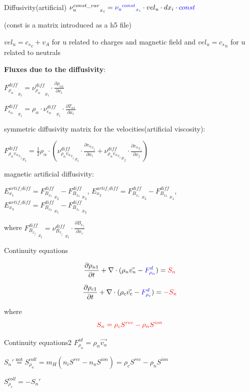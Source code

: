 \documentclass{beamer}
\begin{document}
\begin{frame}{Diffusivity(artificial)}
${\nu_u^{const\_var}}_{x_i}  = \textcolor{blue}{{{\nu_u}^{const}}_{x_i}} \cdot  vel_u \cdot  dx_i \cdot  \textcolor{blue}{const}$ 

(const is a matrix introduced as a h5 file)

$vel_u =  {c_s}_c + v_A$ for u  related to charges and magnetic field and 
$vel_u =  {c_s}_n $ for u  related to neutrals

\textbf{Fluxes due to the diffusivity}:

${F_{\rho_\alpha}^{diff}}_{x_i} =  {\nu_{\rho_\alpha}^{diff}}_{x_i} \cdot \frac{\partial \rho_{\alpha1}}{\partial x_i}$

${F_{\epsilon_\alpha}^{diff}}_{x_i} =  \rho_\alpha \cdot {\nu_{\epsilon_\alpha}^{diff}}_{x_i} \cdot \frac{\partial T_{\alpha1}}{\partial x_i}$


symmetric diffusivity matrix for the velocities(artificial viscosity):

${F_{\rho_\alpha{v_\alpha}_{x_j}}^{diff}}_{x_i}  = \frac{1}{2} \rho_\alpha \cdot ({\nu_{\rho_\alpha{v_\alpha}_{x_j}}^{diff}}_{x_i} \cdot \frac{\partial {v_\alpha}_{x_j}}{\partial x_i} +  {\nu_{\rho_\alpha{v_\alpha}_{x_i}}^{diff}}_{x_j} \cdot \frac{\partial {v_\alpha}_{x_i}}{\partial x_j} )$

magnetic artificial diffusivity:

$E^{artif\_diff}_{x_1} = {F_{B_{x_3}}^{diff}}_{x_2} - {F_{B_{x_2}}^{diff}}_{x_3}   $,  
$E^{artif\_diff}_{x_2} = {F_{B_{x_1}}^{diff}}_{x_3} - {F_{B_{x_3}}^{diff}}_{x_1}   $,  
$E^{artif\_diff}_{x_3} = {F_{B_{x_2}}^{diff}}_{x_1} - {F_{B_{x_1}}^{diff}}_{x_2}   $  

where 
${F_{B_{x_j}}^{diff}}_{x_i} =  {\nu_{B_{x_j}}^{diff}}_{x_i} \cdot \frac{\partial B_{x_j}}{\partial x_i}$

\end{frame}
\begin{frame}{Continuity equations}
\begin{small}
 \[ \frac{\partial \rho_{n1}}{\partial t} + \nabla \cdot (\rho_n \vec{v_n} - {\color{blue} F^d_{\rho_n} } )= {\color{red}  S_n }  \]

 \[ \frac{\partial \rho_{c1}}{\partial t} + \nabla \cdot (\rho_c \vec{v_c} - {\color{blue} F^d_{\rho_c}  } )= {\color{red}  -S_n }  \]
\end{small}
where
\[{\color{red} S_n = \rho_c S^{rec} - \rho_n S^{ion} }  \]
\end{frame}
\begin{frame}{Continuity equations2}
$F_{\rho_{\alpha}}^{id} = \rho_\alpha \vec{v_\alpha} $

$S_n' \stackrel{\text{not}}{=} S_{\rho_n}^{coll} = m_H (n_i S^{rec} - n_n S^{ion} ) = \rho_c S^{rec} - \rho_n S^{ion} $

$S_{\rho_c}^{coll} = -S_n'$
\end{frame}
\end{document}
